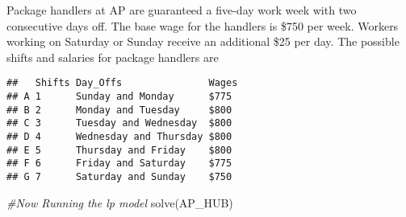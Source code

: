 \documentclass[
]{article}
\newenvironment{Shaded}{\begin{snugshade}}{\end{snugshade}}
\newcommand{\AttributeTok}[1]{\textcolor[rgb]{0.77,0.63,0.00}{#1}}
\newcommand{\CommentTok}[1]{\textcolor[rgb]{0.56,0.35,0.01}{\textit{#1}}}
\newcommand{\DecValTok}[1]{\textcolor[rgb]{0.00,0.00,0.81}{#1}}
\newcommand{\FunctionTok}[1]{\textcolor[rgb]{0.00,0.00,0.00}{#1}}
\newcommand{\NormalTok}[1]{#1}
\newcommand{\OtherTok}[1]{\textcolor[rgb]{0.56,0.35,0.01}{#1}}
\newcommand{\StringTok}[1]{\textcolor[rgb]{0.31,0.60,0.02}{#1}}
\begin{document}
Package handlers at AP are guaranteed a five-day work week with two
consecutive days off. The base wage for the handlers is \$750 per week.
Workers working on Saturday or Sunday receive an additional \$25 per
day. The possible shifts and salaries for package handlers are

\begin{Shaded}
\end{Shaded}

\begin{verbatim}
##   Shifts Day_Offs               Wages
## A 1      Sunday and Monday      $775 
## B 2      Monday and Tuesday     $800 
## C 3      Tuesday and Wednesday  $800 
## D 4      Wednesday and Thursday $800 
## E 5      Thursday and Friday    $800 
## F 6      Friday and Saturday    $775 
## G 7      Saturday and Sunday    $750
\end{verbatim}

\begin{Shaded}
\begin{Highlighting}[]
\CommentTok{\#Now Running the lp model}
\FunctionTok{solve}\NormalTok{(AP\_HUB)}
\end{Highlighting}
\end{Shaded}
\end{document}
